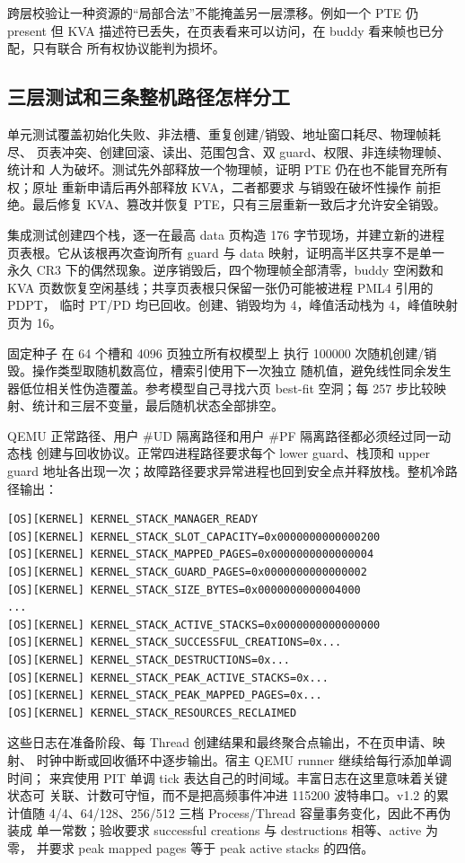 跨层校验让一种资源的“局部合法”不能掩盖另一层漂移。例如一个 PTE 仍 present
但 KVA 描述符已丢失，在页表看来可以访问，在 buddy 看来帧也已分配，只有联合
所有权协议能判为损坏。

\subsection{三层测试和三条整机路径怎样分工}

单元测试覆盖初始化失败、非法槽、重复创建/销毁、地址窗口耗尽、物理帧耗尽、
页表冲突、创建回滚、读出、范围包含、双 guard、权限、非连续物理帧、统计和
人为破坏。测试先外部释放一个物理帧，证明 PTE 仍在也不能冒充所有权；原址
重新申请后再外部释放 KVA，二者都要求  与销毁在破坏性操作
前拒绝。最后修复 KVA、篡改并恢复 PTE，只有三层重新一致后才允许安全销毁。

集成测试创建四个栈，逐一在最高 data 页构造 176 字节现场，并建立新的进程
页表根。它从该根再次查询所有 guard 与 data 映射，证明高半区共享不是单一
永久 CR3 下的偶然现象。逆序销毁后，四个物理帧全部清零，buddy 空闲数和
KVA 页数恢复空闲基线；共享页表根只保留一张仍可能被进程 PML4 引用的 PDPT，
临时 PT/PD 均已回收。创建、销毁均为 4，峰值活动栈为 4，峰值映射页为 16。

固定种子  在 64 个槽和 4096 页独立所有权模型上
执行 100000 次随机创建/销毁。操作类型取随机数高位，槽索引使用下一次独立
随机值，避免线性同余发生器低位相关性伪造覆盖。参考模型自己寻找六页
best-fit 空洞；每 257 步比较映射、统计和三层不变量，最后随机状态全部排空。

QEMU 正常路径、用户 \#UD 隔离路径和用户 \#PF 隔离路径都必须经过同一动态栈
创建与回收协议。正常四进程路径要求每个 lower guard、栈顶和 upper guard
地址各出现一次；故障路径要求异常进程也回到安全点并释放栈。整机冷路径输出：

\begin{verbatim}
[OS][KERNEL] KERNEL_STACK_MANAGER_READY
[OS][KERNEL] KERNEL_STACK_SLOT_CAPACITY=0x0000000000000200
[OS][KERNEL] KERNEL_STACK_MAPPED_PAGES=0x0000000000000004
[OS][KERNEL] KERNEL_STACK_GUARD_PAGES=0x0000000000000002
[OS][KERNEL] KERNEL_STACK_SIZE_BYTES=0x0000000000004000
...
[OS][KERNEL] KERNEL_STACK_ACTIVE_STACKS=0x0000000000000000
[OS][KERNEL] KERNEL_STACK_SUCCESSFUL_CREATIONS=0x...
[OS][KERNEL] KERNEL_STACK_DESTRUCTIONS=0x...
[OS][KERNEL] KERNEL_STACK_PEAK_ACTIVE_STACKS=0x...
[OS][KERNEL] KERNEL_STACK_PEAK_MAPPED_PAGES=0x...
[OS][KERNEL] KERNEL_STACK_RESOURCES_RECLAIMED
\end{verbatim}

这些日志在准备阶段、每 Thread 创建结果和最终聚合点输出，不在页申请、映射、
时钟中断或回收循环中逐步输出。宿主 QEMU runner 继续给每行添加单调时间；
来宾使用 PIT 单调 tick 表达自己的时间域。丰富日志在这里意味着关键状态可
关联、计数可守恒，而不是把高频事件冲进 115200 波特串口。v1.2 的累计值随
4/4、64/128、256/512 三档 Process/Thread 容量事务变化，因此不再伪装成
单一常数；验收要求 successful creations 与 destructions 相等、active 为零，
并要求 peak mapped pages 等于 peak active stacks 的四倍。

